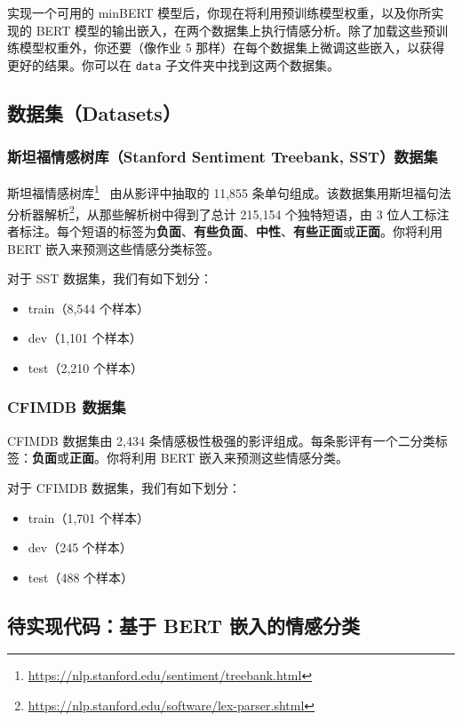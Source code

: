 \documentclass[11pt]{article}
\begin{document}
实现一个可用的 minBERT 模型后，你现在将利用预训练模型权重，以及你所实现的 BERT 模型的输出嵌入，在两个数据集上执行情感分析。除了加载这些预训练模型权重外，你还要（像作业 5 那样）在每个数据集上微调这些嵌入，以获得更好的结果。你可以在 \texttt{data} 子文件夹中找到这两个数据集。

\subsection{数据集（Datasets）}

\subsubsection{斯坦福情感树库（Stanford Sentiment Treebank, SST）数据集}

斯坦福情感树库\footnote{\url{https://nlp.stanford.edu/sentiment/treebank.html}}~\cite{socher2013recursive} 由从影评中抽取的 11{,}855 条单句组成。该数据集用斯坦福句法分析器解析\footnote{\url{https://nlp.stanford.edu/software/lex-parser.shtml}}，从那些解析树中得到了总计 215{,}154 个独特短语，由 3 位人工标注者标注。每个短语的标签为\textbf{负面}、\textbf{有些负面}、\textbf{中性}、\textbf{有些正面}或\textbf{正面}。你将利用 BERT 嵌入来预测这些情感分类标签。

对于 SST 数据集，我们有如下划分：
\begin{itemize}[leftmargin=1.5em]
  \item train（8{,}544 个样本）
  \item dev（1{,}101 个样本）
  \item test（2{,}210 个样本）
\end{itemize}

\subsubsection{CFIMDB 数据集}

CFIMDB 数据集由 2{,}434 条情感极性极强的影评组成。每条影评有一个二分类标签：\textbf{负面}或\textbf{正面}。你将利用 BERT 嵌入来预测这些情感分类。

对于 CFIMDB 数据集，我们有如下划分：
\begin{itemize}[leftmargin=1.5em]
  \item train（1{,}701 个样本）
  \item dev（245 个样本）
  \item test（488 个样本）
\end{itemize}

\subsection{待实现代码：基于 BERT 嵌入的情感分类}
\end{document}
